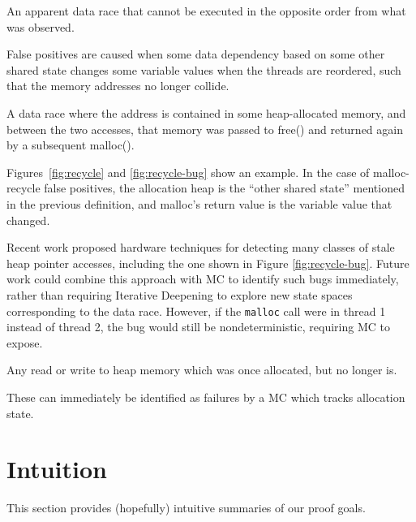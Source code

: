 \begin{definition}
	An apparent data race that cannot be executed in the opposite order from what was observed.
\end{definition}

False positives are caused when some data dependency based on some other shared state %
changes some variable values when the threads are reordered, such that the memory addresses no longer collide.

\begin{definition}
	A data race where the address is contained in some heap-allocated memory, and between the two accesses, that memory was passed to free() and returned again by a subsequent malloc().
\end{definition}

Figures~\ref{fig:recycle} and \ref{fig:recycle-bug} show an example.
In the case of malloc-recycle false positives, the allocation heap is the ``other shared state'' mentioned in the previous definition, and malloc's return value is the variable value that changed.

Recent work \cite{sparc-ssm} proposed hardware techniques for detecting many classes of stale heap pointer accesses, including the one shown in Figure \ref{fig:recycle-bug}.
Future work could combine this approach with MC to identify such bugs immediately,
rather than requiring Iterative Deepening to explore new state spaces corresponding to the data race.
However, if the {\tt malloc} call were in thread 1 instead of thread 2, the bug would still be nondeterministic, requiring MC to expose.

\begin{definition}
	Any read or write to heap memory which was once allocated, but no longer is.
\end{definition}

These can immediately be identified as failures by a MC which tracks allocation state.


\section{Intuition}

This section provides (hopefully) intuitive summaries of our proof goals.

